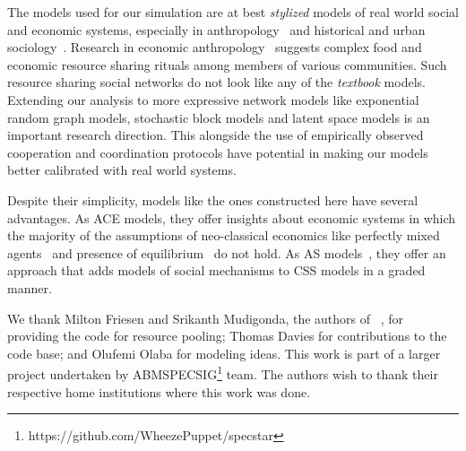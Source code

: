 The models used for our simulation are at best \textit{stylized} models of real world social and economic systems, especially in anthropology~\cite{white2011kinship} and historical and urban sociology~\cite{sampson2012great,katz2013people}. Research in economic anthropology~\cite{koster2019,koster2014,koster2015,bogerhoff2015,smith2019,nolin2012,power2018cooperation,power2018} suggests complex food and economic resource sharing rituals among members of various communities. Such resource sharing social networks do not look like any of the \textit{textbook} models. Extending our analysis to more expressive network models like exponential random graph models, stochastic block models and latent space models is an important research direction. This alongside the use of empirically observed cooperation and coordination protocols have potential in making our models better calibrated with real world systems.   

Despite their simplicity, models like the ones constructed here have several advantages.  As ACE models, they offer insights about economic systems in which the majority of the assumptions of neo-classical economics like perfectly mixed agents~\cite{wilhite} and presence of equilibrium~\cite{arthur} do not hold. As AS models~\cite{hedstrom2011oxford}, they offer an approach that adds models of social mechanisms to CSS models in a graded manner.  

\begin{acks}
We thank Milton Friesen and Srikanth Mudigonda, the authors of ~\cite{srimil}, for providing the code for resource pooling; Thomas Davies for contributions to the code base; and Olufemi Olaba for modeling ideas. This work is part of a larger project undertaken by ABMSPECSIG\footnote{https://github.com/WheezePuppet/specstar} team. The authors wish to thank their respective home institutions where this work was done.
\end{acks}



